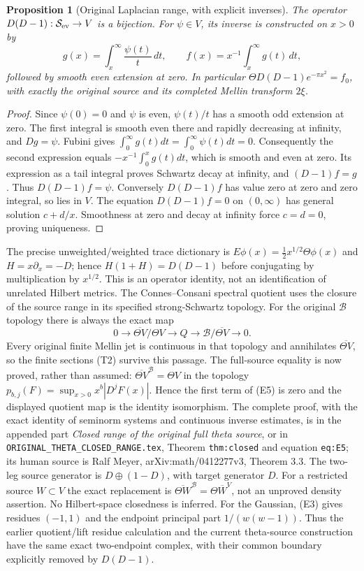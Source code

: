 \documentclass[11pt]{article}
\newtheorem{proposition}[theorem]{Proposition}
\newcommand{\B}{\mathscr B}\newcommand{\M}{\mathcal M}
\begin{document}
\begin{proposition}[Original Laplacian range, with explicit inverses]
The operator $D(D-1):\mathcal S_{\rm ev}\to V$ is a bijection.
For $\psi\in V$, its inverse is constructed on $x>0$ by
\[
 g(x)=\int_x^\infty\frac{\psi(t)}t\,dt,
 \qquad f(x)=x^{-1}\int_x^\infty g(t)\,dt,
 \tag{E4}
\]
followed by smooth even extension at zero. In particular
$\Theta D(D-1)e^{-\pi x^2}=f_0$, with exactly the original source
and its completed Mellin transform $2\xi$.
\end{proposition}
\begin{proof}
Since $\psi(0)=0$ and $\psi$ is even, $\psi(t)/t$ has a smooth odd
extension at zero. The first integral is smooth even there and rapidly
decreasing at infinity, and $Dg=\psi$. Fubini gives
$\int_0^\infty g(t)dt=\int_0^\infty\psi(t)dt=0$.
Consequently the second expression equals
$-x^{-1}\int_0^xg(t)dt$, which is smooth and even at zero.
Its expression as a tail integral proves Schwartz decay at infinity,
and $(D-1)f=g$. Thus $D(D-1)f=\psi$.
Conversely $D(D-1)f$ has value zero at zero and zero integral, so lies
in $V$. The equation $D(D-1)f=0$ on $(0,\infty)$ has general solution
$c+d/x$. Smoothness at zero and decay at infinity force $c=d=0$,
proving uniqueness.
\end{proof}

The precise unweighted/weighted trace dictionary is
$E\phi(x)=\tfrac12 x^{1/2}\Theta\phi(x)$ and
$H=x\partial_x=-D$; hence $H(1+H)=D(D-1)$ before conjugating
by multiplication by $x^{1/2}$. This is an operator identity, not an
identification of unrelated Hilbert metrics. The Connes--Consani spectral
quotient uses the closure of the source range in its specified
strong-Schwartz topology. For the original $\B$ topology there is always
the exact map
\[
 0\to\overline{\Theta V}/\Theta V\to Q
       \to\B/\overline{\Theta V}\to0.\tag{E5}
\]
Every original finite Mellin jet is continuous in that topology and
annihilates $\overline{\Theta V}$, so the finite sections (T2) survive
this passage. The full-source equality is now proved, rather than assumed:
$\overline{\Theta V}^{\mathscr B}=\Theta V$ in the topology
$p_{b,j}(F)=\sup_{x>0}x^b|D^jF(x)|$. Hence the first term of (E5)
is zero and the displayed quotient map is the identity isomorphism.
The complete proof, with the exact identity of seminorm systems and
continuous inverse estimates, is in the appended part
\emph{Closed range of the original full theta source}, or in
\texttt{ORIGINAL\_THETA\_CLOSED\_RANGE.tex}, Theorem
\texttt{thm:closed} and equation \texttt{eq:E5}; its human source is
Ralf Meyer, arXiv:math/0412277v3, Theorem 3.3. The two-leg source
generator is $D\oplus(1-D)$, with target generator $D$.
For a restricted source $W\subset V$ the exact replacement is
$\overline{\Theta W}^{\mathscr B}=\Theta\overline W^{V}$,
not an unproved density assertion. No Hilbert-space closedness is inferred.
For the Gaussian, (E3) gives residues $(-1,1)$ and the endpoint principal
part $1/(w(w-1))$. Thus the earlier quotient/lift residue calculation
and the current theta-source construction have the same exact two-endpoint
complex, with their common boundary explicitly removed by $D(D-1)$.
\end{document}
